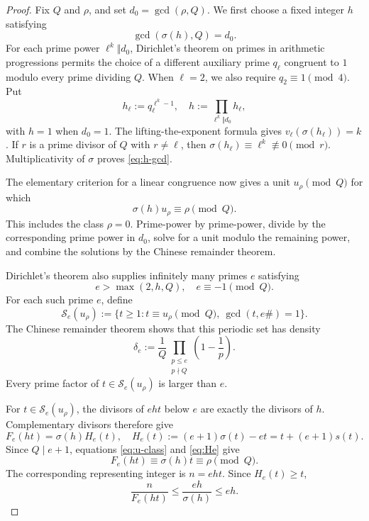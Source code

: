 \documentclass[11pt,letterpaper,reqno]{amsart}
\numberwithin{equation}{section}
\theoremstyle{remark}
\renewcommand{\leq}{\leqslant}
\renewcommand{\geq}{\geqslant}
\begin{document}
\begin{proof}
Fix $Q$ and $\rho$, and set $d_0=\gcd(\rho,Q)$. We first choose a fixed
integer $h$ satisfying
\begin{equation}\label{eq:h-gcd}
 \gcd(\sigma(h),Q)=d_0.
\end{equation}
For each prime power $\ell^k\Vert d_0$, Dirichlet's theorem on primes in
arithmetic progressions permits the choice of a different auxiliary prime
$q_\ell$ congruent to $1$ modulo every prime dividing $Q$. When $\ell=2$,
we also require $q_2\equiv1\pmod4$. Put
\[
 h_\ell:=q_\ell^{\ell^k-1},\quad
 h:=\prod_{\ell^k\Vert d_0}h_\ell,
\]
with $h=1$ when $d_0=1$. The lifting-the-exponent formula gives
$v_\ell(\sigma(h_\ell))=k$. If $r$ is a prime divisor of $Q$ with $r\ne\ell$, then
$\sigma(h_\ell)\equiv\ell^k\not\equiv0\pmod r$. Multiplicativity of
$\sigma$ proves \eqref{eq:h-gcd}.

The elementary criterion for a linear congruence now gives a unit
$u_\rho\pmod Q$ for which
\begin{equation}\label{eq:u-class}
 \sigma(h)u_\rho\equiv\rho\pmod Q.
\end{equation}
This includes the class $\rho=0$. Prime-power by prime-power, divide by the
corresponding prime power in $d_0$, solve for a unit modulo the remaining
power, and combine the solutions by the Chinese remainder theorem.

Dirichlet's theorem also supplies infinitely many primes $e$ satisfying
\[
 e>\max(2,h,Q),\quad e\equiv-1\pmod Q.
\]
For each such prime $e$, define
\[
 \mathcal{S}_e(u_\rho):=\{t\geq1:t\equiv u_\rho\pmod Q,\
 \gcd(t,e\#)=1\}.
\]
The Chinese remainder theorem shows that this periodic set has density
\[
 \delta_e:=\frac1Q
 \prod_{\substack{p\leq e\\p\nmid Q}}\left(1-\frac1p\right).
\]
Every prime factor of $t\in\mathcal{S}_e(u_\rho)$ is larger than $e$.

For $t\in\mathcal{S}_e(u_\rho)$, the divisors of $eht$ below $e$ are exactly
the divisors of $h$. Complementary divisors therefore give
\begin{equation}\label{eq:He}
 F_e(ht)=\sigma(h)H_e(t),
 \quad H_e(t):=(e+1)\sigma(t)-et=t+(e+1)s(t).
\end{equation}
Since $Q\mid e+1$, equations
\eqref{eq:u-class} and \eqref{eq:He} give
\[
 F_e(ht)\equiv\sigma(h)t\equiv\rho\pmod Q.
\]
The corresponding representing integer is $n=eht$. Since $H_e(t)\geq t$,
\begin{equation}\label{eq:representing-ratio}
 \frac{n}{F_e(ht)}\leq\frac{eh}{\sigma(h)}\leq eh.
\end{equation}


\end{proof}
\end{document}
